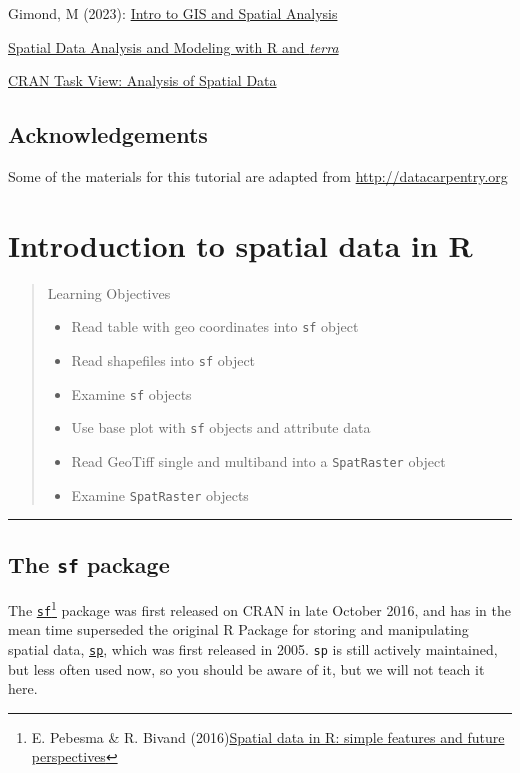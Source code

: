 \documentclass[
]{book}
\providecommand{\tightlist}{%
  \setlength{\itemsep}{0pt}\setlength{\parskip}{0pt}}
\begin{document}
Gimond, M (2023): \href{https://mgimond.github.io/Spatial/index.html}{Intro to GIS and Spatial Analysis}

\href{http://www.rspatial.org/index.html}{Spatial Data Analysis and Modeling with R and \emph{terra}}

\href{https://CRAN.R-project.org/view=Spatial}{CRAN Task View: Analysis of Spatial Data}

\hypertarget{acknowledgements}{%
\section*{Acknowledgements}\label{acknowledgements}}

Some of the materials for this tutorial are adapted from \url{http://datacarpentry.org}

\hypertarget{intro}{%
\chapter{Introduction to spatial data in R}\label{intro}}

\begin{quote}
Learning Objectives

\begin{itemize}
\tightlist
\item
  Read table with geo coordinates into \texttt{sf} object
\item
  Read shapefiles into \texttt{sf} object
\item
  Examine \texttt{sf} objects
\item
  Use base plot with \texttt{sf} objects and attribute data
\item
  Read GeoTiff single and multiband into a \texttt{SpatRaster} object
\item
  Examine \texttt{SpatRaster} objects
\end{itemize}
\end{quote}

\begin{center}\rule{0.5\linewidth}{0.5pt}\end{center}

\hypertarget{the-sf-package}{%
\section{\texorpdfstring{The \texttt{sf} package}{The sf package}}\label{the-sf-package}}

The \href{https://cran.r-project.org/package=sf}{\texttt{sf}}\footnote{E. Pebesma \& R. Bivand (2016)\href{http://pebesma.staff.ifgi.de/pebesma_sfr.pdf}{Spatial data in R: simple features and
  future perspectives}} package was first released on CRAN in late October 2016, and has in the mean time superseded the original R Package for storing and manipulating spatial data, \href{https://CRAN.R-project.org/package=sp}{\texttt{sp}}, which was first released in 2005. \texttt{sp} is still actively maintained, but less often used now, so you should be aware of it, but we will not teach it here.
\end{document}
